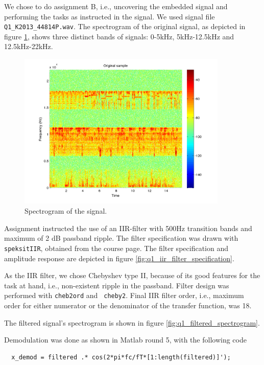 We chose to do
assignment B, i.e., uncovering the embedded signal and performing the
tasks as instructed in the signal.
We used signal file {\tt Q1\_K2013\_44814P.wav}. The spectrogram of the original signal, as depicted in figure \ref{fig:q1_spectrogram}, shows three distinct bands of signals: 0-5kHz, 5kHz-12.5kHz and 12.5kHz-22kHz.

\begin{figure}[h!]
  \begin{center}
    \hspace*{-1in}
    \includegraphics[width=100mm]{q1_spectrogram}
    \caption{Spectrogram of the signal. \label{fig:q1_spectrogram}}
  \end{center}  
\end{figure}

Assignment instructed the use of an IIR-filter with 500Hz transition
bands and maximum of 2 dB passband ripple.  The filter specification was
drawn with {\tt speksitIIR}, obtained from the course page.  The filter
specification and amplitude response are depicted in
figure \ref{fig:q1_iir_filter_specification}.

As the IIR filter, we chose Chebyshev type II, because of its good
features for the task at hand, i.e., non-existent ripple in the
passband.  Filter design was performed with {\tt cheb2ord} and {\tt
cheby2}.  Final IIR filter order, i.e., maximum order for either
numerator or the denominator of the transfer function, was 18.

The filtered signal's spectrogram is shown in figure
\ref{fig:q1_filtered_spectrogram}.

Demodulation was done as shown in Matlab round 5, with the following code
\begin{verbatim}
  x_demod = filtered .* cos(2*pi*fc/fT*[1:length(filtered)]');
\end{verbatim}

